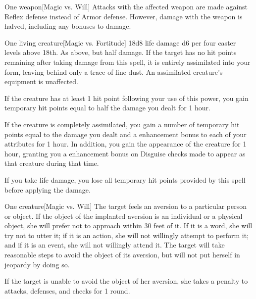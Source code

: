 \spellrng{\rngclose}
\spelldur{\durshort \dismissable}
\begin{spelltarget}{One weapon}[Magic vs. Will]
    \spellsuccess Attacks with the affected weapon are made against Reflex defense instead of Armor defense. However, damage with the weapon is halved, including any bonuses to damage.
\end{spelltarget}

\spellrng{\rngtouch}
\begin{spelltarget}{One living creature}[Magic vs. Fortitude]
    \spellsuccess 18d8 life damage \add d6 per four caster levels above 18th. 
    \spellfailure As above, but half damage.
    \spelleffect If the target has no hit points remaining after taking damage from this spell, it is entirely assimilated into your form, leaving behind only a trace of fine dust. An assimilated creature's equipment is unaffected.
    \par If the creature has at least 1 hit point following your use of this power, you gain temporary hit points equal to half the damage you dealt for 1 hour.
    \par If the creature is completely assimilated, you gain a number of temporary hit points equal to the damage you dealt and a  enhancement bonus to each of your attributes for 1 hour. In addition, you gain the appearance of the creature for 1 hour, granting you a  enhancement bonus on Disguise checks made to appear as that creature during that time.
\end{spelltarget}
\spellnotes If you take life damage, you lose all temporary hit points provided by this spell before applying the damage.

\spellrng{\rngmed}
\spelldur{\durshort}
\begin{spelltarget}{One creature}[Magic vs. Will]
    \spellsuccess The target feels an aversion to a particular person or object. If the object of the implanted aversion is an individual or a physical object, she will prefer not to approach within 30 feet of it. If it is a word, she will try not to utter it; if it is an action, she will not willingly attempt to perform it; and if it is an event, she will not willingly attend it. The target will take reasonable steps to avoid the object of its aversion, but will not put herself in jeopardy by doing so.
    \par If the target is unable to avoid the object of her aversion, she takes a  penalty to attacks, defenses, and checks for 1 round.
\end{spelltarget}


